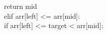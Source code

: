 \documentclass[preview]{standalone}
\begin{document}
return mid\\elif arr[left] <= arr[mid]:\\if arr[left] <= target < arr[mid]:\\
\end{document}
